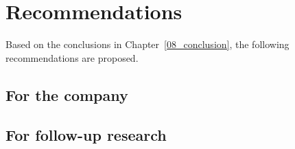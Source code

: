 \chapter{Recommendations} \label{09_recommendations}

Based on the conclusions in Chapter~\ref{08_conclusion}, the following recommendations are proposed. 

\section{For the company}

\section{For follow-up research}
